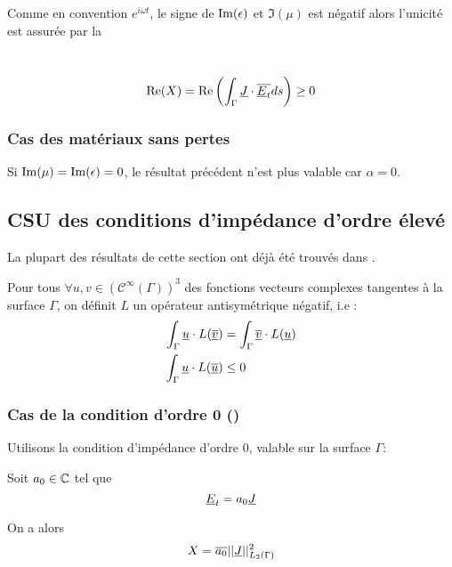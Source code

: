 Comme en convention $e^{i\omega t}$, le signe de $\operatorname{Im}(\epsilon)$ et $\Im(\mu)$ est négatif
alors l'unicité est assurée par la
\begin{defn}~\\
\begin{equation}\label{eq:unicite:form_var:cgu}
\operatorname{Re}(X) = \operatorname{Re}\left(\int_\Gamma \underline{J} \cdot {\overline{\underline{E}_t}} ds\right) \ge 0
\end{equation}
\end{defn}

\subsubsection{Cas des matériaux sans pertes}

Si $\operatorname{Im}(\mu) = \operatorname{Im}(\epsilon) = 0$, le résultat précédent n'est plus valable car $\alpha = 0$.


\subsection{CSU des conditions d'impédance d'ordre élevé}

La plupart des résultats de cette section ont déjà été trouvés dans \cite{stupfel_sufficient_2011}.


Pour tous $\forall u, v \in (\mathcal C^\infty(\Gamma))^3$ des fonctions vecteurs complexes tangentes à la surface $\Gamma$, on définit $L$ un opérateur antisymétrique négatif, i.e : 
\begin{align*}
\int_\Gamma \underline{u}\cdot L({\overline{\underline{v}}}) &= \int_\Gamma {\overline{\underline{v}}}\cdot L(\underline{u})\\
\int_\Gamma \underline{u}\cdot L({\overline{\underline{u}}}) &\le 0
\end{align*}

\subsubsection{Cas de la condition d'ordre 0 (\cite{stupfel_sufficient_2011})}
Utilisons la condition d’impédance d'ordre 0, valable sur la surface $\Gamma$: 

Soit $a_0 \in \mathbb C$ tel que
\[
\underline{E}_t = a_0 \underline{J}
\]

On a alors
\begin{equation*}
X = {\overline{a_0}}||\underline{J}||_{L_2(\Gamma)}^2
\end{equation*}

